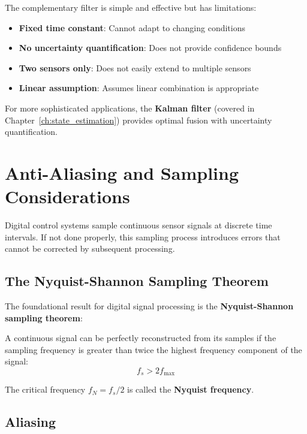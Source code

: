 The complementary filter is simple and effective but has limitations:
\begin{itemize}
    \item \textbf{Fixed time constant}: Cannot adapt to changing conditions
    \item \textbf{No uncertainty quantification}: Does not provide confidence bounds
    \item \textbf{Two sensors only}: Does not easily extend to multiple sensors
    \item \textbf{Linear assumption}: Assumes linear combination is appropriate
\end{itemize}

For more sophisticated applications, the \textbf{Kalman filter} (covered in Chapter~\ref{ch:state_estimation}) provides optimal fusion with uncertainty quantification.

\section{Anti-Aliasing and Sampling Considerations}
\label{sec:antialiasing}

Digital control systems sample continuous sensor signals at discrete time intervals. If not done properly, this sampling process introduces errors that cannot be corrected by subsequent processing.

\subsection{The Nyquist-Shannon Sampling Theorem}

The foundational result for digital signal processing is the \textbf{Nyquist-Shannon sampling theorem}:

\begin{theorem}
A continuous signal can be perfectly reconstructed from its samples if the sampling frequency is greater than twice the highest frequency component of the signal:
\begin{equation}
f_s > 2 f_{\max}
\label{eq:nyquist}
\end{equation}
\end{theorem}

The critical frequency $f_N = f_s/2$ is called the \textbf{Nyquist frequency}.

\subsection{Aliasing}


